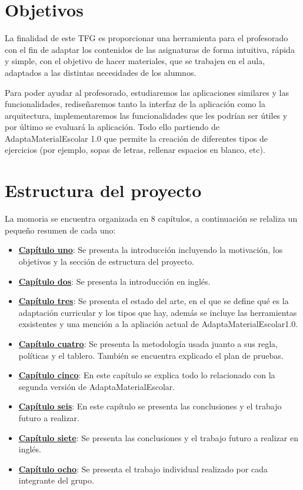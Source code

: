 \section{Objetivos}\label{cap:objetivos}
La finalidad de este TFG es proporcionar una herramienta para el profesorado con el fin de adaptar los contenidos de las asignaturas de forma intuitiva, rápida y simple, con el objetivo de hacer materiales, que se trabajen en el aula, adaptados a las distintas necesidades de los alumnos.

Para poder ayudar al profesorado, estudiaremos las aplicaciones similares y las funcionalidades, rediseñaremos tanto la interfaz de la aplicación como la arquitectura, implementaremos las funcionalidades que les podrían ser útiles y por último se evaluará la aplicación. Todo ello partiendo de AdaptaMaterialEscolar 1.0  que permite la creación de diferentes tipos de ejercicios (por ejemplo, sopas de letras, rellenar espacios en blanco, etc).



\section{Estructura del proyecto}\label{cap:estructura}
La momoria se encuentra organizada en 8 capítulos, a continuación se relaliza un pequeño resumen de cada uno:
\begin{itemize}
    \item \textbf{\hyperref[ch:introduccion]{Capítulo uno}}: Se presenta la introducción incluyendo la motivación, los objetivos y la sección de estructura del proyecto.
    \item \textbf{\hyperref[cap:introduction]{Capítulo dos}}: Se presenta la introducción en inglés. 
    \item \textbf{\hyperref[cap:estadoDelArte]{Capítulo tres}}: Se presenta el estado del arte, en el que se define qué es la adaptación curricular y los tipos que hay, además se incluye las herramientas exsistentes y una mención a la apliación actual de  AdaptaMaterialEscolar1.0.
    \item \textbf{\hyperref[cap:metodologia]{Capítulo cuatro}}: Se presenta la metodología usada juanto a sus regla, políticas y el tablero. También se encuentra explicado el plan de pruebas.
    \item \textbf{\hyperref[cap:AdaptaMaterialEscolar2.0]{Capítulo cinco}}: En este capítulo se explica todo lo relacionado con la segunda versión de AdaptaMaterialEscolar.
    \item \textbf{\hyperref[cap:conclusiones]{Capítulo seis}}: En este capítulo se presenta las conclusiones y el trabajo futuro a realizar.
    \item \textbf{\hyperref[cap:conclusions]{Capítulo siete}}: Se presenta las conclusiones y el trabajo futuro a realizar en inglés.
    \item \textbf{\hyperref[cap:trabajo_individual]{Capítulo ocho}}: Se presenta el trabajo individual realizado por cada integrante del grupo.
\end{itemize}